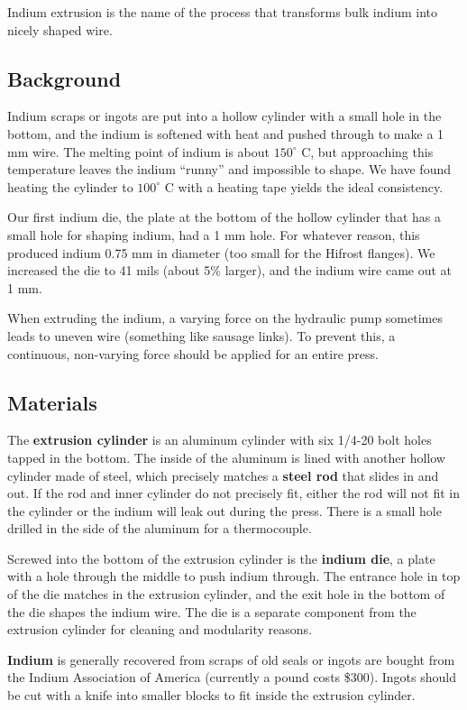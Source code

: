 Indium extrusion is the name of the process that transforms bulk indium into nicely shaped wire.

\subsection{Background} 

Indium scraps or ingots are put into a hollow cylinder with a small hole in the bottom, and the indium is softened with heat and pushed through to make a 1 mm wire.  The melting point of indium is about $150 ^\circ$ C, but approaching this temperature leaves the indium ``runny'' and impossible to shape.  We have found heating the cylinder to $100 ^\circ$ C with a heating tape yields the ideal consistency.

Our first indium die, the plate at the bottom of the hollow cylinder that has a small hole for shaping indium, had a 1 mm hole.  For whatever reason, this produced indium 0.75 mm in diameter (too small for the Hifrost flanges).  We increased the die to 41 mils (about 5\% larger), and the indium wire came out at 1 mm.  

When extruding the indium, a varying force on the hydraulic pump sometimes leads to uneven wire (something like sausage links).  To prevent this, a continuous, non-varying force should be applied for an entire press.

\subsection{Materials}
The \textbf{extrusion cylinder} is an aluminum cylinder with six 1/4-20 bolt holes tapped in the bottom.  The inside of the aluminum is lined with another hollow cylinder made of steel, which precisely matches a \textbf{steel rod} that slides in and out.  If the rod and inner cylinder do not precisely fit, either the rod will not fit in the cylinder or the indium will leak out during the press.  There is a small hole drilled in the side of the aluminum for a thermocouple.

Screwed into the bottom of the extrusion cylinder is the \textbf{indium die}, a plate with a hole through the middle to push indium through.  The entrance hole in top of the die matches in the extrusion cylinder, and the exit hole in the bottom of the die shapes the indium wire.  The die is a separate component from the extrusion cylinder for cleaning and modularity reasons.

\textbf{Indium} is generally recovered from scraps of old seals or ingots are bought from the Indium Association of America (currently a pound costs \$300).  Ingots should be cut with a knife into smaller blocks to fit inside the extrusion cylinder.

